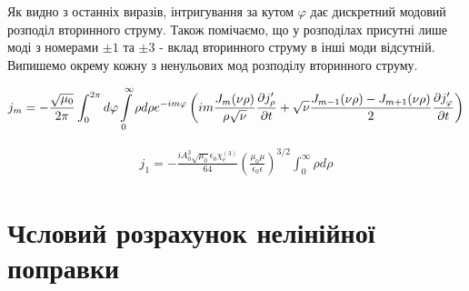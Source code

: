 Як видно з останніх виразів, інтригування за кутом $ \varphi $ дає дискретний 
модовий розподіл вторинного струму.  Також помічаємо, що у розподілах присутні 
лише моді з номерами $ \pm 1 $ та $ \pm 3 $ - вклад вторинного струму в інші
моди відсутній. Випишемо окрему кожну з ненульових мод розподілу вторинного 
струму.

\textcolor{blue} { \begin{equation*} \begin{aligned}
j_m = - \frac{\sqrt{\mu_0}}{2\pi} 
\int_0^{2\pi} d \varphi \int \limits_0^\infty \rho d \rho
e^{-im\varphi} \left( i m \frac{J_m (\nu \rho)}{\rho \sqrt{\nu}}
\frac{\partial j_\rho^\prime}{\partial t} + \sqrt{\nu}
\frac{J_{m-1} (\nu \rho) - J_{m+1} (\nu \rho)}{2}
\frac{\partial j_\varphi^\prime}{\partial t} \right)
\end{aligned} \end{equation*} }

\begin{equation*} \begin{aligned}
j_1 = - \frac{i A_0^3 \sqrt{\mu_0} \epsilon_0 \chi_e^{(3)}}{64}
\left( \frac{\mu_0 \mu}{\epsilon_0 \epsilon} \right)^{3/2}
\int_0^\infty \rho d \rho
\end{aligned} \end{equation*}


\section{Чсловий розрахунок нелінійної поправки}

